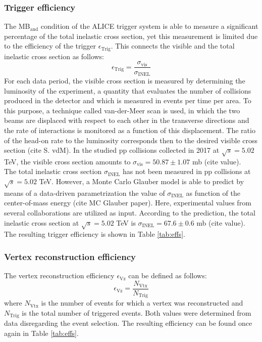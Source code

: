 \documentclass[12pt,a4paper]{report}
\begin{document}
\subsubsection{Trigger efficiency}
The MB$_\text{and}$ condition of the ALICE trigger system is able to measure a significant percentage of the total inelastic cross section, yet this measurement is limited due to the efficiency of the trigger $\epsilon_\text{Trig}$. This connects the visible and the total inelastic cross section as follows:
\begin{equation}
\epsilon_\text{Trig}  =  \dfrac{\sigma_\text{vis}}{\sigma_\text{INEL}} 
\label{effTrig}
\end{equation}
For each data period, the visible cross section is measured by determining the luminosity of the experiment, a quantity that evaluates the number of collisions produced in the detector and which is measured in events per time per area. To this purpose, a technique called van-der-Meer scan is used, in which the two beams are displaced with respect to each other in the transverse directions and the rate of interactions is monitored as a function of this displacement. The ratio of the head-on rate to the luminosity corresponds then to the desired visible cross section (cite S. vdM). In the studied pp collisions collected in 2017 at $\sqrt{s} = 5.02$ TeV, the visible cross section amounts to $\sigma_\text{vis} = 50.87 \pm 1.07$ mb (cite value). \\
The total inelastic cross section $\sigma_\text{INEL}$ has not been measured in pp collisions at $\sqrt{s} = 5.02$ TeV. However, a Monte Carlo Glauber model is able to predict by means of a data-driven parametrization the value of $\sigma_\text{INEL}$ as function of the center-of-mass energy 	(cite MC Glauber paper). Here, experimental values from several collaborations are utilized as input. According to the prediction, the total inelastic cross section at $\sqrt{s} = 5.02$ TeV is $\sigma_\text{INEL} = 67.6 \pm 0.6$ mb (cite value). The resulting trigger efficiency is shown in Table \ref{tab:effs}.
\subsubsection{Vertex reconstruction efficiency}
The vertex reconstruction efficiency $\epsilon_\text{Vz}$ can be defined as follows:
\begin{equation}
\epsilon_\text{Vz} = \dfrac{N_\text{Vtx}}{N_\text{Trig}} 
\end{equation}
where $N_\text{Vtx}$ is the number of events for which a vertex was reconstructed and $N_\text{Trig}$ is the total number of triggered events. Both values were determined from data disregarding the event selection. The resulting efficiency can be found once again in Table \ref{tab:effs}.
\end{document}
